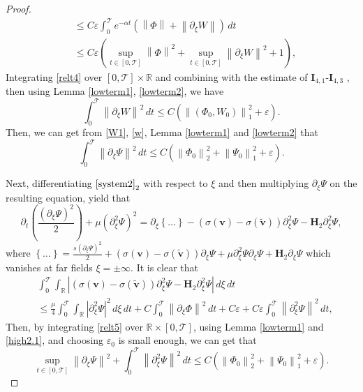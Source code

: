 \documentclass[12pt,reqno]{amsart}
\numberwithin{equation}{section}
\newcommand{\norm}[1]{\left\lVert #1 \right\rVert}
\newcommand{\abs}[1]{\left\lvert #1 \right\rvert}
\newcommand{\subeqref}[2]{$ \eqref{#1}_{#2} $}
\def\p{\partial}
\def\R{\mathbb{R}}
\def\T{\mathcal{T}}
\def\supt{\mathop{sup}\limits_{t \in [0,\mathcal{T}]}}
\begin{document}
\begin{proof}
\begin{align*}
			&\leq C\varepsilon\int_{0}^{\T}e^{-\alpha t} (\norm{\Phi}+\norm{\p_{\xi}W})\,dt\\
			&\leq C\varepsilon(\supt\norm{\Phi}^2+\supt\norm{\p_{\xi}W}^2+1),
		\end{align*}
		Integrating \eqref{relt4} over $[0,\T]\times\mathbb{R}$ and combining with the estimate of $\mathbf{I}_{4,1}$-$\mathbf{I}_{4,3}$ , then using Lemma \ref{lowterm1}, \ref{lowterm2}, we have
		\begin{equation}\label{W1}
			\int_{0}^{\T} \norm{\p_{\xi}W}^2 \,dt\leq C(\norm{(\Phi_0,W_0)}^2_1+\varepsilon).
		\end{equation}
		Then, we can get from \eqref{W1}, \eqref{w}, Lemma \ref{lowterm1} and \ref{lowterm2} that
		\begin{equation}\label{psi1}
			\int_{0}^{\T} \norm{\p_{\xi}\Psi}^2 \,dt\leq C(\norm{\Phi_0}^2_2+\norm{\Psi_0}^2_1+\varepsilon).
		\end{equation}
		
		Next, differentiating \subeqref{system2}{2} with respect to $\xi$ and then multiplying $\p_{\xi}\Psi$ on the resulting equation, yield that
		\begin{equation}\label{relt5}
			\p_t\left(\frac{(\p_{\xi}\Psi)^2}{2}\right)+\mu(\p^2_{\xi}\Psi)^2=\p_{\xi}\left\{\dots\right\}-(\sigma(\mathbf{v})-\sigma(\mathbf{\tilde{v}}))\p^2_{\xi}\Psi-\mathbf{H}_2\p^2_{\xi}\Psi,
		\end{equation}
		where $\left\{\dots\right\}=\frac{s(\p_{\xi}\Psi)^2}{2}+(\sigma(\mathbf{v})-\sigma(\mathbf{\tilde{v}}))\p_{\xi}\Psi+\mu\p^2_{\xi}\Psi\p_{\xi}\Psi+\mathbf{H}_2\p_{\xi}\Psi$ which vanishes at far fields $\xi=\pm\infty$. It is clear that
		\begin{equation}\label{high2.1}
			\begin{aligned}
				&\int_{0}^{\T}\int_{\R}\abs{(\sigma(\mathbf{v})-\sigma(\mathbf{\tilde{v}}))\p^2_{\xi}\Psi-\mathbf{H}_2\p^2_{\xi}\Psi}\,d\xi\,dt\\
				&\leq \frac{\mu}{4}\int_{0}^{\T}\int_{\R}\abs{\p^2_{\xi}\Psi}^2\,d\xi\,dt+C\int_{0}^{\T}\norm{\p_{\xi}\Phi}^2\,dt+C\varepsilon+C\varepsilon\int_{0}^{\T}\norm{\p^2_{\xi}\Psi}^2 \,dt,  
			\end{aligned}
		\end{equation}
		Then, by integrating \eqref{relt5} over $\R\times[0,\T]$, using Lemma \ref{lowterm1} and \eqref{high2.1}, and choosing $\varepsilon_0$ is small enough, we can get that
		\begin{equation}\label{estimate3}
			\supt\norm{\p_{\xi}\Psi}^2+\int_{0}^{\T}\norm{\p^2_{\xi}\Psi}^2\,dt\leq C(\norm{\Phi_0}^2_2+\norm{\Psi_0}^2_1+\varepsilon). 
		\end{equation}
		

\end{proof}
\end{document}
